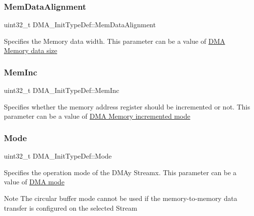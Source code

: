 \subsubsection{\texorpdfstring{Mem\+Data\+Alignment}{MemDataAlignment}}
{\footnotesize\ttfamily uint32\+\_\+t D\+M\+A\+\_\+\+Init\+Type\+Def\+::\+Mem\+Data\+Alignment}

Specifies the Memory data width. This parameter can be a value of \hyperlink{group___d_m_a___memory__data__size}{D\+MA Memory data size} \mbox{\label{struct_d_m_a___init_type_def_a49b187ba5ab8ba4354e02837e8b99414}} 
\subsubsection{\texorpdfstring{Mem\+Inc}{MemInc}}
{\footnotesize\ttfamily uint32\+\_\+t D\+M\+A\+\_\+\+Init\+Type\+Def\+::\+Mem\+Inc}

Specifies whether the memory address register should be incremented or not. This parameter can be a value of \hyperlink{group___d_m_a___memory__incremented__mode}{D\+MA Memory incremented mode} \mbox{\label{struct_d_m_a___init_type_def_adbbca090b53d32ac93cc7359b7994db2}} 
\subsubsection{\texorpdfstring{Mode}{Mode}}
{\footnotesize\ttfamily uint32\+\_\+t D\+M\+A\+\_\+\+Init\+Type\+Def\+::\+Mode}

Specifies the operation mode of the D\+M\+Ay Streamx. This parameter can be a value of \hyperlink{group___d_m_a__mode}{D\+MA mode} \begin{DoxyNote}{Note}
The circular buffer mode cannot be used if the memory-\/to-\/memory data transfer is configured on the selected Stream 
\end{DoxyNote}
\mbox{\label{struct_d_m_a___init_type_def_a3fbfe4dd664e24845dc75f5c8f43b5a3}} 
